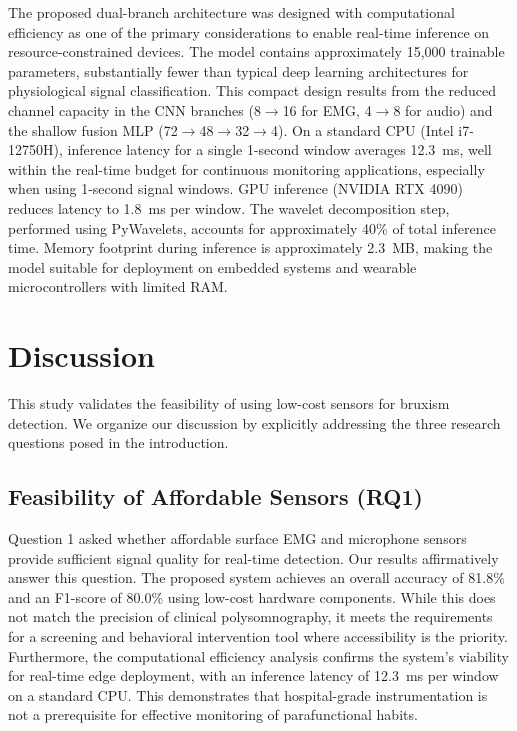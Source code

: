 \documentclass[pdflatex,sn-vancouver-num, iicol]{sn-jnl}
\begin{document}
The proposed dual-branch architecture was designed with computational efficiency as one of the primary considerations to enable real-time inference on resource-constrained devices. The model contains approximately 15,000 trainable parameters, substantially fewer than typical deep learning architectures for physiological signal classification. This compact design results from the reduced channel capacity in the CNN branches (8$\rightarrow$16 for EMG, 4$\rightarrow$8 for audio) and the shallow fusion MLP (72$\rightarrow$48$\rightarrow$32$\rightarrow$4). On a standard CPU (Intel i7-12750H), inference latency for a single 1-second window averages 12.3~ms, well within the real-time budget for continuous monitoring applications, especially when using 1-second signal windows. GPU inference (NVIDIA RTX 4090) reduces latency to 1.8~ms per window. The wavelet decomposition step, performed using PyWavelets, accounts for approximately 40\% of total inference time. Memory footprint during inference is approximately 2.3~MB, making the model suitable for deployment on embedded systems and wearable microcontrollers with limited RAM.


\section{Discussion}

This study validates the feasibility of using low-cost sensors for bruxism detection. We organize our discussion by explicitly addressing the three research questions posed in the introduction.

\subsection{Feasibility of Affordable Sensors (RQ1)}
Question 1 asked whether affordable surface EMG and microphone sensors provide sufficient signal quality for real-time detection. Our results affirmatively answer this question. The proposed system achieves an overall accuracy of 81.8\% and an F1-score of 80.0\% using low-cost hardware components. While this does not match the precision of clinical polysomnography, it meets the requirements for a screening and behavioral intervention tool where accessibility is the priority. Furthermore, the computational efficiency analysis confirms the system's viability for real-time edge deployment, with an inference latency of 12.3~ms per window on a standard CPU. This demonstrates that hospital-grade instrumentation is not a prerequisite for effective monitoring of parafunctional habits.
\end{document}
